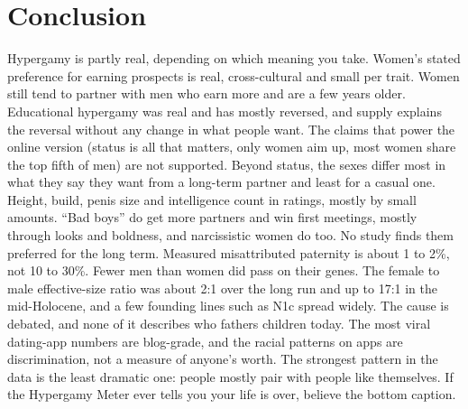 \documentclass[conference,a4paper]{IEEEtran}
\begin{document}
\section{Conclusion}
Hypergamy is partly real, depending on which meaning you take. Women's stated preference for earning prospects is real, cross-cultural and small per trait. Women still tend to partner with men who earn more and are a few years older. Educational hypergamy was real and has mostly reversed, and supply explains the reversal without any change in what people want. The claims that power the online version (status is all that matters, only women aim up, most women share the top fifth of men) are not supported. Beyond status, the sexes differ most in what they say they want from a long-term partner and least for a casual one. Height, build, penis size and intelligence count in ratings, mostly by small amounts. ``Bad boys'' do get more partners and win first meetings, mostly through looks and boldness, and narcissistic women do too. No study finds them preferred for the long term. Measured misattributed paternity is about 1 to 2\%, not 10 to 30\%. Fewer men than women did pass on their genes. The female to male effective-size ratio was about 2:1 over the long run and up to 17:1 in the mid-Holocene, and a few founding lines such as N1c spread widely. The cause is debated, and none of it describes who fathers children today. The most viral dating-app numbers are blog-grade, and the racial patterns on apps are discrimination, not a measure of anyone's worth. The strongest pattern in the data is the least dramatic one: people mostly pair with people like themselves. If the Hypergamy Meter ever tells you your life is over, believe the bottom caption.



\end{document}

